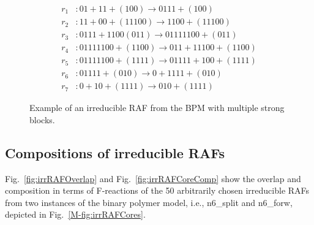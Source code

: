 \documentclass[pdflatex]{sn-jnl}
\theoremstyle{thmstyleone}%
\theoremstyle{examplesty}%
\theoremstyle{thmstylethree}%
\begin{document}
\begin{figure}[tbh]
\begin{minipage}[c]{0.4\textwidth}
	\end{minipage}%
	\hfill%
	\begin{minipage}[c]{0.6\textwidth}
		\par\bigskip
		\par\bigskip
		\par\bigskip
		\par\bigskip
		\par\bigskip
		\par\bigskip
		\par\bigskip
		\par\bigskip
		\par\bigskip
		\par\bigskip
		\par\bigskip
		\par\bigskip
		\begin{equation*}
			\begin{split}
				r_1&: 01 + 11 + (100) \rightarrow 0111 + (100) \\
				r_2&: 11 + 00 + (11100) \rightarrow 1100 + (11100) \\
				r_3&: 0111 + 1100 (011) \rightarrow 01111100 + (011) \\
				r_4&: 01111100 + (1100) \rightarrow 011 + 11100 + (1100) \\
				r_5&: 01111100 + (1111) \rightarrow 01111 + 100 + (1111) \\
				r_6&: 01111 + (010) \rightarrow 0 + 1111 + (010) \\
				r_7&: 0 + 10 + (1111) \rightarrow 010 + (1111)
			\end{split}
		\end{equation*}
	\end{minipage}
	\caption{Example of an irreducible RAF from the BPM with multiple strong blocks.}
	\label{fig:BPMMultipleStrongBlocks}	
\end{figure}

\subsection{Compositions of irreducible RAFs}
Fig.~\ref{fig:irrRAFOverlap} and Fig.~\ref{fig:irrRAFCoreComp} show the overlap and 
composition in terms of F-reactions of the 50 arbitrarily chosen irreducible RAFs from 
two instances of the binary polymer model, i.e., n6\_split and n6\_forw, depicted in 
Fig.~\ref{M-fig:irrRAFCores}.
\end{document}
